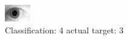 \begin{figure}[h!]
\begin{center}
\includegraphics[width=0.60\columnwidth]{figures/ID1861_class_4_target_3.png}
\end{center}
\caption{ Classification: 4 actual target: 3}
\label{fig:ID1861_class_4_target_3}
\end{figure}
